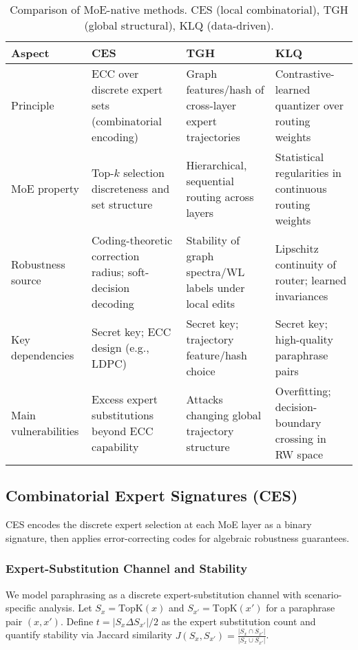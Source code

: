 \begin{table*}[t]
\centering
\small
\begin{tabular}{|l|p{3.2cm}|p{3.2cm}|p{3.2cm}|}
\hline
\textbf{Aspect} & \textbf{CES} & \textbf{TGH} & \textbf{KLQ} \\
\hline
Principle & ECC over discrete expert sets (combinatorial encoding) & Graph features/hash of cross-layer expert trajectories & Contrastive-learned quantizer over routing weights \\
MoE property & Top-$k$ selection discreteness and set structure & Hierarchical, sequential routing across layers & Statistical regularities in continuous routing weights \\
Robustness source & Coding-theoretic correction radius; soft-decision decoding & Stability of graph spectra/WL labels under local edits & Lipschitz continuity of router; learned invariances \\
Key dependencies & Secret key; ECC design (e.g., LDPC) & Secret key; trajectory feature/hash choice & Secret key; high-quality paraphrase pairs \\
Main vulnerabilities & Excess expert substitutions beyond ECC capability & Attacks changing global trajectory structure & Overfitting; decision-boundary crossing in RW space \\
\hline
\end{tabular}
\caption{Comparison of MoE-native methods. CES (local combinatorial), TGH (global structural), KLQ (data-driven).}
\label{tab:method_compare}
\end{table*}

\subsection{Combinatorial Expert Signatures (CES)}

CES encodes the discrete expert selection at each MoE layer as a binary signature, then applies error-correcting codes for algebraic robustness guarantees.

\subsubsection{Expert-Substitution Channel and Stability}

We model paraphrasing as a discrete expert-substitution channel with scenario-specific analysis. Let $S_x = \text{TopK}(x)$ and $S_{x'} = \text{TopK}(x')$ for a paraphrase pair $(x,x')$. Define $t = |S_x \Delta S_{x'}|/2$ as the expert substitution count and quantify stability via Jaccard similarity $J(S_x,S_{x'}) = \frac{|S_x \cap S_{x'}|}{|S_x \cup S_{x'}|}$.

